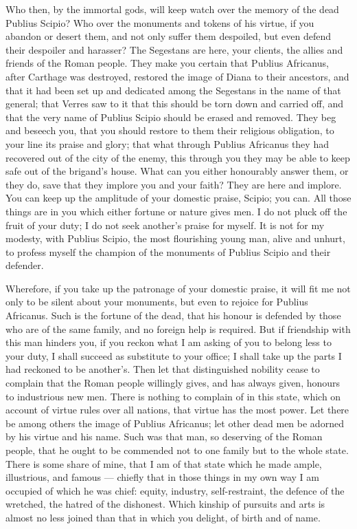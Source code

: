  Who then, by the immortal gods, will keep watch over the memory of the dead Publius Scipio? Who over the monuments and tokens of his virtue, if you abandon or desert them, and not only suffer them despoiled, but even defend their despoiler and harasser? The Segestans are here, your clients, the allies and friends of the Roman people. They make you certain that Publius Africanus, after Carthage was destroyed, restored the image of Diana to their ancestors, and that it had been set up and dedicated among the Segestans in the name of that general; that Verres saw to it that this should be torn down and carried off, and that the very name of Publius Scipio should be erased and removed. They beg and beseech you, that you should restore to them their religious obligation, to your line its praise and glory; that what through Publius Africanus they had recovered out of the city of the enemy, this through you they may be able to keep safe out of the brigand's house. What can you either honourably answer them, or they do, save that they implore you and your faith? They are here and implore. You can keep up the amplitude of your domestic praise, Scipio; you can. All those things are in you which either fortune or nature gives men. I do not pluck off the fruit of your duty; I do not seek another's praise for myself. It is not for my modesty, with Publius Scipio, the most flourishing young man, alive and unhurt, to profess myself the champion of the monuments of Publius Scipio and their defender.

 Wherefore, if you take up the patronage of your domestic praise, it will fit me not only to be silent about your monuments, but even to rejoice for Publius Africanus. Such is the fortune of the dead, that his honour is defended by those who are of the same family, and no foreign help is required. But if friendship with this man hinders you, if you reckon what I am asking of you to belong less to your duty, I shall succeed as substitute to your office; I shall take up the parts I had reckoned to be another's. Then let that distinguished nobility cease to complain that the Roman people willingly gives, and has always given, honours to industrious new men. There is nothing to complain of in this state, which on account of virtue rules over all nations, that virtue has the most power. Let there be among others the image of Publius Africanus; let other dead men be adorned by his virtue and his name. Such was that man, so deserving of the Roman people, that he ought to be commended not to one family but to the whole state. There is some share of mine, that I am of that state which he made ample, illustrious, and famous --- chiefly that in those things in my own way I am occupied of which he was chief: equity, industry, self-restraint, the defence of the wretched, the hatred of the dishonest. Which kinship of pursuits and arts is almost no less joined than that in which you delight, of birth and of name.


